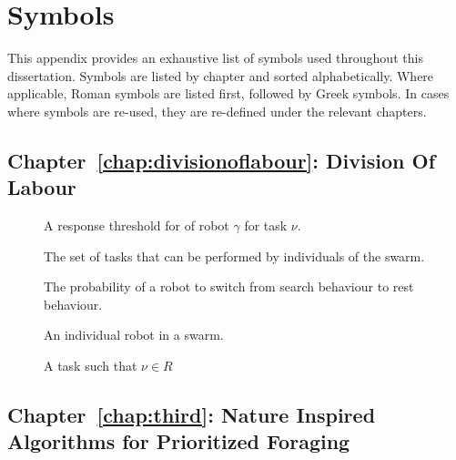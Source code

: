 
\chapter{Symbols}
\label{app:symbols}

This appendix provides an exhaustive list of symbols used throughout this dissertation.
Symbols are listed by chapter and sorted alphabetically. Where applicable, Roman
symbols are listed first, followed by Greek symbols. In cases where symbols are re-used,
they are re-defined under the relevant chapters.


\section{Chapter~\ref{chap:divisionoflabour}: Division Of Labour}
\label{sec:symbols:divisionoflabour}


\begin{description}
	\item[\parbox{\namewidth}{$r_{\gamma,\nu}$}] A response threshold for of robot $\gamma$ for task $\nu$.
	\item[\parbox{\namewidth}{$R$}] The set of tasks that can be performed by individuals of the swarm.
	\item[\parbox{\namewidth}{$z$}] The probability of a robot to switch from search behaviour to rest behaviour.
	\item[\parbox{\namewidth}{$\gamma$}] An individual robot in a swarm.
	\item[\parbox{\namewidth}{$\nu$}] A task such that $\nu \in R$

\end{description}



\section{Chapter~\ref{chap:third}: Nature Inspired Algorithms for Prioritized Foraging}
\label{sec:symbols:foraging}

